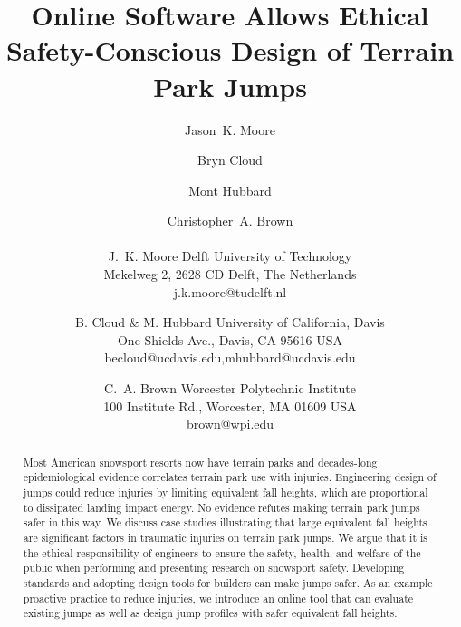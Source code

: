 \documentclass{article}
\begin{document}
\title{Online Software Allows Ethical Safety-Conscious Design of Terrain Park Jumps}

\author{
  Jason~K. Moore \and
  Bryn Cloud \and
  Mont Hubbard \and
  Christopher~A. Brown \\\\
  J.~K. Moore
  Delft University of Technology\\
  Mekelweg 2, 2628 CD Delft, The Netherlands\\
  j.k.moore@tudelft.nl
  \and
  B. Cloud \& M. Hubbard
  University of California, Davis\\
  One Shields Ave., Davis, CA 95616 USA\\
  becloud@ucdavis.edu,mhubbard@ucdavis.edu
  \and
  C.~A. Brown
  Worcester Polytechnic Institute\\
  100 Institute Rd., Worcester, MA 01609 USA\\
  brown@wpi.edu
}

\maketitle

\begin{abstract}
  Most American snowsport resorts now have terrain parks and decades-long
  epidemiological evidence correlates terrain park use with injuries.
  Engineering design of jumps could reduce injuries by limiting equivalent fall
  heights, which are proportional to dissipated landing impact energy.  No
  evidence refutes making terrain park jumps safer in this way. We discuss case
  studies illustrating that large equivalent fall heights are significant
  factors in traumatic injuries on terrain park jumps. We argue that it is the
  ethical responsibility of engineers to ensure the safety, health, and welfare
  of the public when performing and presenting research on snowsport safety.
  Developing standards and adopting design tools for builders can make jumps
  safer. As an example proactive practice to reduce injuries, we introduce an
  online tool that can evaluate existing jumps as well as design jump profiles
  with safer equivalent fall heights.
\end{abstract}
\end{document}

